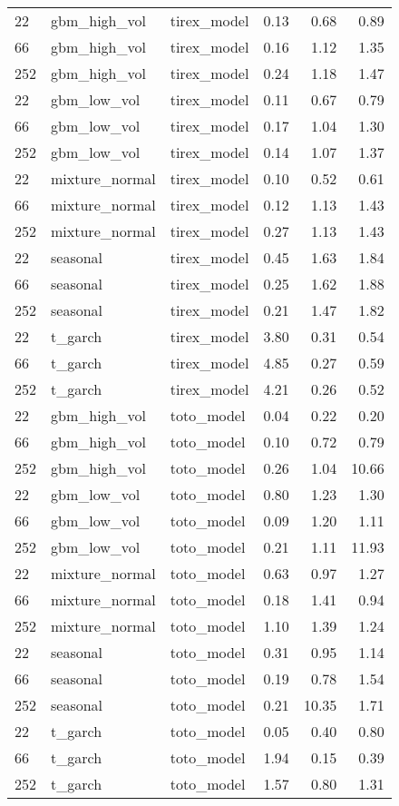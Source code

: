 {\begin{tabular}{lllrrr}
\midrule
22 & gbm\_high\_vol & tirex\_model & 0.13 & 0.68 & 0.89 \\
66 & gbm\_high\_vol & tirex\_model & 0.16 & 1.12 & 1.35 \\
252 & gbm\_high\_vol & tirex\_model & 0.24 & 1.18 & 1.47 \\
\midrule
22 & gbm\_low\_vol & tirex\_model & 0.11 & 0.67 & 0.79 \\
66 & gbm\_low\_vol & tirex\_model & 0.17 & 1.04 & 1.30 \\
252 & gbm\_low\_vol & tirex\_model & 0.14 & 1.07 & 1.37 \\
\midrule
22 & mixture\_normal & tirex\_model & 0.10 & 0.52 & 0.61 \\
66 & mixture\_normal & tirex\_model & 0.12 & 1.13 & 1.43 \\
252 & mixture\_normal & tirex\_model & 0.27 & 1.13 & 1.43 \\
\midrule
22 & seasonal & tirex\_model & 0.45 & 1.63 & 1.84 \\
66 & seasonal & tirex\_model & 0.25 & 1.62 & 1.88 \\
252 & seasonal & tirex\_model & 0.21 & 1.47 & 1.82 \\
\midrule
22 & t\_garch & tirex\_model & 3.80 & 0.31 & 0.54 \\
66 & t\_garch & tirex\_model & 4.85 & 0.27 & 0.59 \\
252 & t\_garch & tirex\_model & 4.21 & 0.26 & 0.52 \\
\midrule
22 & gbm\_high\_vol & toto\_model & 0.04 & 0.22 & 0.20 \\
66 & gbm\_high\_vol & toto\_model & 0.10 & 0.72 & 0.79 \\
252 & gbm\_high\_vol & toto\_model & 0.26 & 1.04 & 10.66 \\
\midrule
22 & gbm\_low\_vol & toto\_model & 0.80 & 1.23 & 1.30 \\
66 & gbm\_low\_vol & toto\_model & 0.09 & 1.20 & 1.11 \\
252 & gbm\_low\_vol & toto\_model & 0.21 & 1.11 & 11.93 \\
\midrule
22 & mixture\_normal & toto\_model & 0.63 & 0.97 & 1.27 \\
66 & mixture\_normal & toto\_model & 0.18 & 1.41 & 0.94 \\
252 & mixture\_normal & toto\_model & 1.10 & 1.39 & 1.24 \\
\midrule
22 & seasonal & toto\_model & 0.31 & 0.95 & 1.14 \\
66 & seasonal & toto\_model & 0.19 & 0.78 & 1.54 \\
252 & seasonal & toto\_model & 0.21 & 10.35 & 1.71 \\
\midrule
22 & t\_garch & toto\_model & 0.05 & 0.40 & 0.80 \\
66 & t\_garch & toto\_model & 1.94 & 0.15 & 0.39 \\
252 & t\_garch & toto\_model & 1.57 & 0.80 & 1.31 \\
\bottomrule
\end{tabular}
}